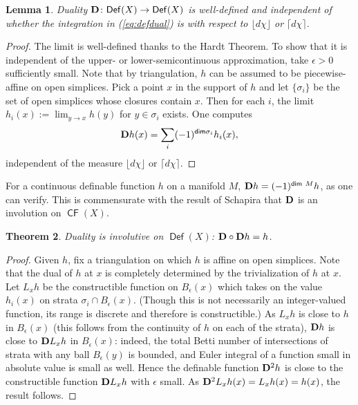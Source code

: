 \documentclass{psapm-l}
\newtheorem{theorem}{Theorem}[section]
\newtheorem{lemma}[theorem]{Lemma}
\theoremstyle{definition}
\theoremstyle{remark}
\numberwithin{equation}{section}
\begin{document}
\begin{lemma}
\label{lem:dualindependent}
Duality ${{\bf D}}\colon{{{\operatorname{\mathsf{{Def}}}}}}(X)\to{{{\operatorname{\mathsf{{Def}}}}}}(X)$ is well-defined and independent of whether the integration in (\ref{eq:defdual}) is with respect to ${{\lfloor d\chi\rfloor}}$ or ${{\lceil d\chi\rceil}}$.
\end{lemma}
\begin{proof}
The limit is well-defined thanks to the Hardt Theorem. To show that it is independent of the upper- or lower-semicontinuous approximation, take $\epsilon>0$ sufficiently small. Note that by triangulation, $h$ can be assumed to be piecewise-affine on open simplices. Pick a point $x$ in the support of $h$ and let $\{\sigma_i\}$ be the set of open simplices whose closures contain $x$. Then for each $i$, the limit $h_i(x):=\lim_{y\to x}h(y)$ for $y\in\sigma_i$ exists. One computes
\begin{equation}
\label{eq:dualsimplices}
    {{\bf D}} h(x)
    =
        \sum_i (-1)^{{{{\operatorname{\mathsf{{dim}}}}}}\sigma_i}h_i(x) ,
\end{equation}
independent of the measure ${{\lfloor d\chi\rfloor}}$ or ${{\lceil d\chi\rceil}}$.
\end{proof}

For a continuous definable function $h$ on a manifold $M$, ${{\bf D}} h = (-1)^{{{{\operatorname{\mathsf{{dim}}}}}}\ M}h$, as one can verify. This is commensurate with the result of Schapira \cite{Schapira:op} that ${{\bf D}}$ is an involution on ${{{\operatorname{\mathsf{{CF}}}}}}(X)$.

\begin{theorem}
Duality is involutive on ${{{\operatorname{\mathsf{{Def}}}}}}(X)$: ${{\bf D}}\circ{{\bf D}} h = h$.
\end{theorem}
\begin{proof}
Given $h$, fix a triangulation on which $h$ is affine on open simplices. Note that the dual of $h$ at $x$ is completely determined by the trivialization of $h$ at $x$. Let $L_x{h}$ be the constructible function on $B_\epsilon(x)$ which takes on the value $h_i(x)$ on strata $\sigma_i\cap B_\epsilon(x)$. (Though this is not necessarily an integer-valued function, its range is discrete and therefore is constructible.) As $L_xh$ is close to $h$ in $B_\epsilon(x)$ (this follows from the continuity of $h$ on each of the strata), ${{\bf D}} h$ is close to ${{\bf D}} L_xh$ in $B_\epsilon(x)$: indeed, the total Betti number of intersections of strata with any ball $B_\epsilon(y)$ is bounded, and Euler integral of a function small in absolute value is small as well. Hence the definable function ${{\bf D}}^2 h$ is close to the constructible function ${{\bf D}} L_xh$ with $\epsilon$ small. As ${{\bf D}}^2L_x{h}(x)=L_x{h}(x)=h(x)$, the result follows.
\end{proof}
\end{document}
